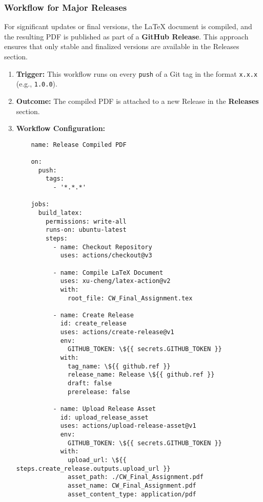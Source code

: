 \documentclass[12pt]{article}
\begin{document}
\subsubsection{Workflow for Major Releases}

For significant updates or final versions, the LaTeX document is compiled, and the resulting PDF is published as part of a \textbf{GitHub Release}. This approach ensures that only stable and finalized versions are available in the Releases section.

\begin{enumerate}
    \item \textbf{Trigger:} This workflow runs on every \texttt{push} of a Git tag in the format \texttt{x.x.x} (e.g., \texttt{1.0.0}).
    \item \textbf{Outcome:} The compiled PDF is attached to a new Release in the \textbf{Releases} section.
    \item \textbf{Workflow Configuration:}
    \begin{verbatim}
    name: Release Compiled PDF

    on:
      push:
        tags:
          - '*.*.*'

    jobs:
      build_latex:
        permissions: write-all
        runs-on: ubuntu-latest
        steps:
          - name: Checkout Repository
            uses: actions/checkout@v3

          - name: Compile LaTeX Document
            uses: xu-cheng/latex-action@v2
            with:
              root_file: CW_Final_Assignment.tex

          - name: Create Release
            id: create_release
            uses: actions/create-release@v1
            env:
              GITHUB_TOKEN: \${{ secrets.GITHUB_TOKEN }}
            with:
              tag_name: \${{ github.ref }}
              release_name: Release \${{ github.ref }}
              draft: false
              prerelease: false

          - name: Upload Release Asset
            id: upload_release_asset
            uses: actions/upload-release-asset@v1
            env:
              GITHUB_TOKEN: \${{ secrets.GITHUB_TOKEN }}
            with:
              upload_url: \${{ steps.create_release.outputs.upload_url }}
              asset_path: ./CW_Final_Assignment.pdf
              asset_name: CW_Final_Assignment.pdf
              asset_content_type: application/pdf
    \end{verbatim}
\end{enumerate}
    
\end{document}
